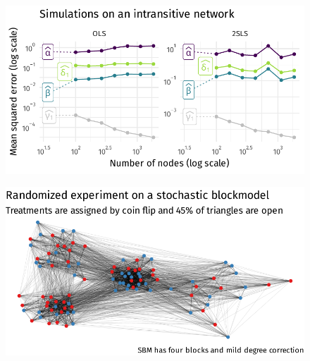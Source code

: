 \documentclass[aspectratio=169]{beamer}
\theoremstyle{remark}
\begin{document}
\begin{frame}
    \begin{figure}
        \centering
        \includegraphics{figures/simulations/defense-mse.pdf}
    \end{figure}
\end{frame}

\begin{frame}
    \begin{figure}
        \centering
        \includegraphics{figures/simulations/defense-backbone.pdf}
    \end{figure}
\end{frame}
\end{document}
